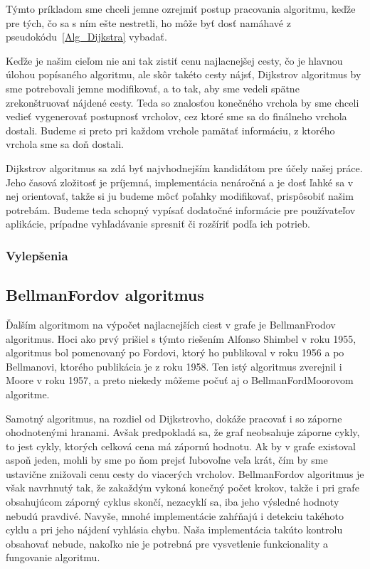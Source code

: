 Týmto príkladom sme chceli jemne ozrejmiť postup pracovania algoritmu, keďže pre tých, čo sa s ním ešte nestretli, ho môže byť dosť namáhavé z pseudokódu~\ref{Alg_Dijkstra} vybadať.\newline

Keďže je našim cieľom nie ani tak zistiť cenu najlacnejšej cesty, čo je hlavnou úlohou popísaného algoritmu, ale skôr takéto cesty nájsť, Dijkstrov algoritmus by sme potrebovali jemne modifikovať, a to tak, aby sme vedeli spätne zrekonštruovať nájdené cesty. Teda so znalosťou konečného vrchola by sme chceli vedieť vygenerovať postupnosť vrcholov, cez ktoré sme sa do finálneho vrchola dostali. Budeme si preto pri každom vrchole pamätať informáciu, z ktorého vrchola sme sa doň dostali.\newline

Dijkstrov algoritmus sa zdá byť najvhodnejším kandidátom pre účely našej práce. Jeho časová zložitosť je príjemná, implementácia nenáročná a je dosť ľahké sa v nej orientovať, takže si ju budeme môcť poľahky modifikovať, prispôsobiť našim potrebám. Budeme teda schopný vypísať dodatočné informácie pre používateľov aplikácie, prípadne vyhľadávanie spresniť či rozšíriť podľa ich potrieb.\newline

\subsubsection{Vylepšenia}





\subsection{Bellman\textendash Fordov algoritmus}

Ďalším algoritmom na výpočet najlacnejších ciest v grafe je Bellman\textendash Frodov algoritmus. Hoci ako prvý prišiel s týmto riešením Alfonso Shimbel v roku 1955, algoritmus bol pomenovaný po Fordovi, ktorý ho publikoval v roku 1956 a po Bellmanovi, ktorého publikácia je z roku 1958. Ten istý algoritmus zverejnil i Moore v roku 1957, a preto niekedy môžeme počuť aj o Bellman\textendash Ford\textendash Moorovom algoritme.\newline

Samotný algoritmus, na rozdiel od Dijkstrovho, dokáže pracovať i so záporne ohodnotenými hranami. Avšak predpokladá sa, že graf neobsahuje záporne cykly, to jest cykly, ktorých celková cena má zápornú hodnotu. Ak by v grafe existoval aspoň jeden, mohli by sme po ňom prejsť ľubovoľne veľa krát, čím by sme ustavične znižovali cenu cesty do viacerých vrcholov. Bellman\textendash Fordov algoritmus je však navrhnutý tak, že zakaždým vykoná konečný počet krokov, takže i pri grafe obsahujúcom záporný cyklus skončí, nezacyklí sa, iba jeho výsledné hodnoty nebudú pravdivé. Navyše, mnohé implementácie zahŕňajú i detekciu takéhoto cyklu a pri jeho nájdení vyhlásia chybu. Naša implementácia takúto kontrolu obsahovať nebude, nakoľko nie je potrebná pre vysvetlenie funkcionality a fungovanie algoritmu.\newline

